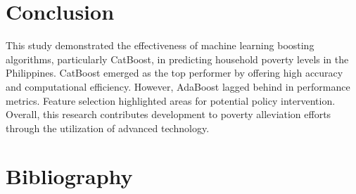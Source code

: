\documentclass[a4paper,fleqn]{cas-sc}
\begin{document}
\section{Conclusion}
This study demonstrated the effectiveness of machine learning boosting algorithms, particularly CatBoost, in predicting household poverty levels in the Philippines. CatBoost emerged as the top performer by offering high accuracy and computational efficiency. However, AdaBoost lagged behind in performance metrics. Feature selection highlighted areas for potential policy intervention. Overall, this research contributes development to poverty alleviation efforts through the utilization of advanced technology.

\section{Bibliography}



\end{document}
